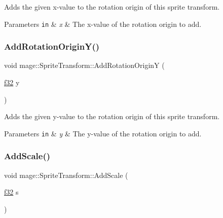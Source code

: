 Adds the given x-\/value to the rotation origin of this sprite transform.


\begin{DoxyParams}[1]{Parameters}
\mbox{\tt in}  & {\em x} & The x-\/value of the rotation origin to add. \\
\hline
\end{DoxyParams}
\hypertarget{structmage_1_1_sprite_transform_a2f28926ff331cc6da8bca11e1f13e341}{}\label{structmage_1_1_sprite_transform_a2f28926ff331cc6da8bca11e1f13e341} 
\subsubsection{\texorpdfstring{Add\+Rotation\+Origin\+Y()}{AddRotationOriginY()}}
{\footnotesize\ttfamily void mage\+::\+Sprite\+Transform\+::\+Add\+Rotation\+OriginY (\begin{DoxyParamCaption}\item[{\hyperlink{namespacemage_a6a44ad388483959dc4dff9f2aef91431}{f32}}]{y }\end{DoxyParamCaption})\hspace{0.3cm}{\ttfamily [noexcept]}}

Adds the given y-\/value to the rotation origin of this sprite transform.


\begin{DoxyParams}[1]{Parameters}
\mbox{\tt in}  & {\em y} & The y-\/value of the rotation origin to add. \\
\hline
\end{DoxyParams}
\hypertarget{structmage_1_1_sprite_transform_a47431cb73818ec2dfc62ca605ace39fa}{}\label{structmage_1_1_sprite_transform_a47431cb73818ec2dfc62ca605ace39fa} 
\subsubsection{\texorpdfstring{Add\+Scale()}{AddScale()}\hspace{0.1cm}{\footnotesize\ttfamily [1/4]}}
{\footnotesize\ttfamily void mage\+::\+Sprite\+Transform\+::\+Add\+Scale (\begin{DoxyParamCaption}\item[{\hyperlink{namespacemage_a6a44ad388483959dc4dff9f2aef91431}{f32}}]{s }\end{DoxyParamCaption})\hspace{0.3cm}{\ttfamily [noexcept]}}

